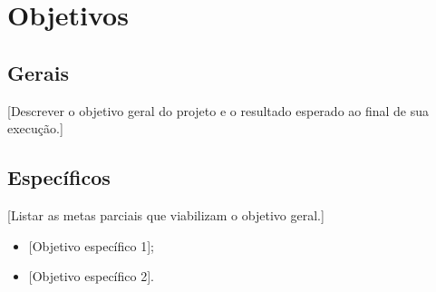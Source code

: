 \chapter{Objetivos}

\section{Gerais}

[Descrever o objetivo geral do projeto e o resultado esperado ao final de sua execução.]

\section{Específicos}

[Listar as metas parciais que viabilizam o objetivo geral.]

\begin{itemize}
    \item {[Objetivo específico 1]};
    \item {[Objetivo específico 2]}.
\end{itemize}
